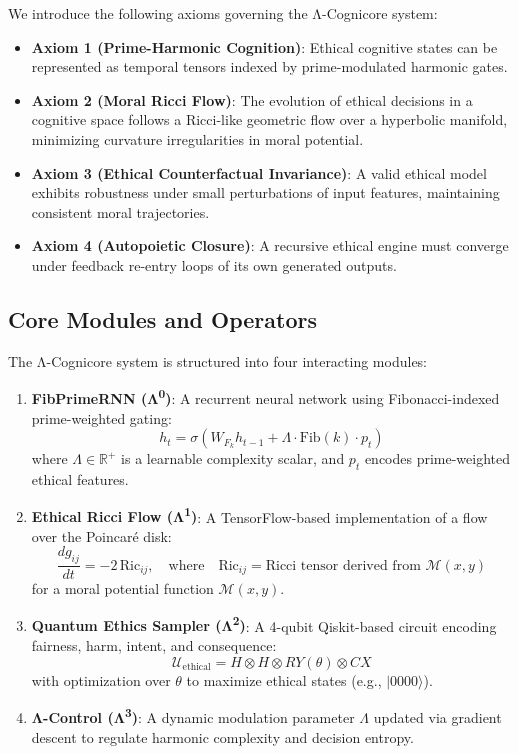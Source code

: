 \documentclass[12]{amsart}
\theoremstyle{plain}
\begin{document}
We introduce the following axioms governing the Λ-Cognicore system:

\begin{itemize}
    \item \textbf{Axiom 1 (Prime-Harmonic Cognition)}: Ethical cognitive states can be represented as temporal tensors indexed by prime-modulated harmonic gates.
    \item \textbf{Axiom 2 (Moral Ricci Flow)}: The evolution of ethical decisions in a cognitive space follows a Ricci-like geometric flow over a hyperbolic manifold, minimizing curvature irregularities in moral potential.
    \item \textbf{Axiom 3 (Ethical Counterfactual Invariance)}: A valid ethical model exhibits robustness under small perturbations of input features, maintaining consistent moral trajectories.
    \item \textbf{Axiom 4 (Autopoietic Closure)}: A recursive ethical engine must converge under feedback re-entry loops of its own generated outputs.
\end{itemize}

\subsection{Core Modules and Operators}

The Λ-Cognicore system is structured into four interacting modules:

\begin{enumerate}
    \item \textbf{FibPrimeRNN (Λ\textsuperscript{0})}: A recurrent neural network using Fibonacci-indexed prime-weighted gating:
    \[
    h_t = \sigma\left(W_{F_k} h_{t-1} + \Lambda \cdot \text{Fib}(k) \cdot p_t\right)
    \]
    where \( \Lambda \in \mathbb{R}^+ \) is a learnable complexity scalar, and \( p_t \) encodes prime-weighted ethical features.

    \item \textbf{Ethical Ricci Flow (Λ\textsuperscript{1})}: A TensorFlow-based implementation of a flow over the Poincaré disk:
    \[
    \frac{d g_{ij}}{dt} = -2 \, \text{Ric}_{ij}, \quad \text{where} \quad \text{Ric}_{ij} = \text{Ricci tensor derived from } \mathcal{M}(x, y)
    \]
    for a moral potential function \( \mathcal{M}(x, y) \).

    \item \textbf{Quantum Ethics Sampler (Λ\textsuperscript{2})}: A 4-qubit Qiskit-based circuit encoding fairness, harm, intent, and consequence:
    \[
    \mathcal{U}_{\text{ethical}} = H \otimes H \otimes RY(\theta) \otimes CX
    \]
    with optimization over \( \theta \) to maximize ethical states (e.g., \( |0000\rangle \)).

    \item \textbf{Λ-Control (Λ\textsuperscript{3})}: A dynamic modulation parameter \( \Lambda \) updated via gradient descent to regulate harmonic complexity and decision entropy.
\end{enumerate}
\end{document}
